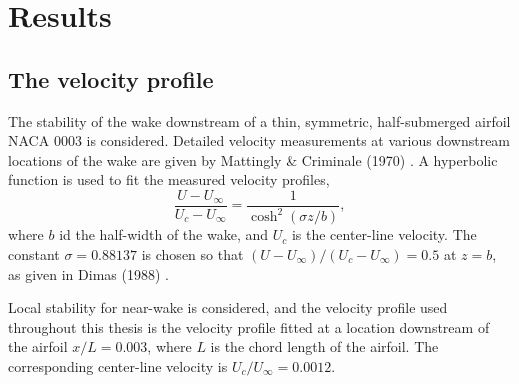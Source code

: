
\chapter{Results} \label{ch:results}
\section{The velocity profile}
The stability of the wake downstream of a thin, symmetric, half-submerged airfoil NACA 0003 is considered. Detailed velocity measurements at various downstream locations of the wake are given by Mattingly \& Criminale (1970) \cite{RN7}. A hyperbolic function is used to fit the measured velocity profiles,
\begin{equation}
    \displaystyle \frac{U -U_{\infty }}{U_{c} -U_{\infty }} =\frac{1}{\cosh^{2}( \sigma z/b)},
    \label{eq:U}
\end{equation}
where $b$ id the half-width of the wake, and $U_c$ is the center-line velocity. The constant $\sigma=0.88137$ is chosen so that $( U-U_{\infty }) /( U_{c} -U_{\infty }) =0.5$ at $z=b$, as given in Dimas (1988) \cite{RN8}.

Local stability for near-wake is considered, and the velocity profile used throughout this thesis is the velocity profile fitted at a location downstream of the airfoil $x/L=0.003$, where $L$ is the chord length of the airfoil. The corresponding center-line velocity is $U_c/U_{\infty}=0.0012$.